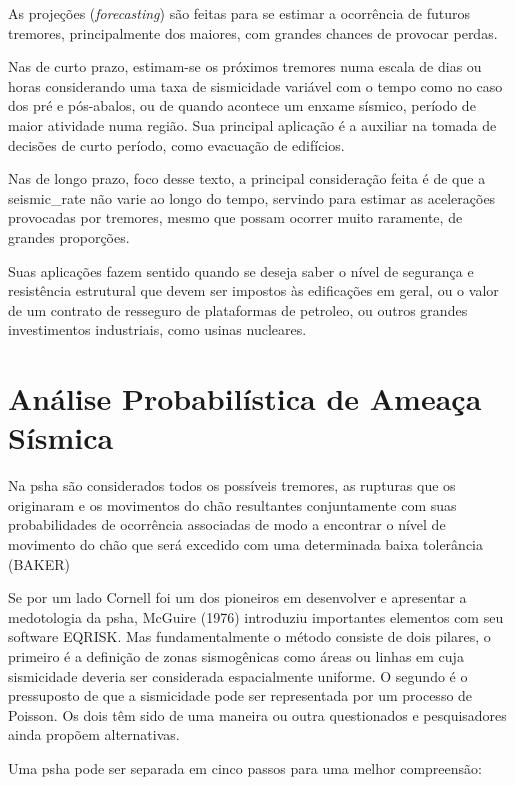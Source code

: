 As projeções (\textit{forecasting}) são feitas para se estimar a ocorrência de futuros tremores,
principalmente dos maiores, com grandes chances de provocar perdas.

Nas de curto prazo, estimam-se os próximos tremores
numa escala de dias ou horas considerando uma taxa de sismicidade variável 
com o tempo como no caso dos pré e pós-abalos, ou de quando 
acontece um enxame sísmico, período de maior atividade numa região.
Sua principal aplicação é a auxiliar na tomada de decisões de curto período, 
como evacuação de edifícios.

Nas de longo prazo, foco desse texto, a principal consideração feita é de que a 
\gls{seismic_rate} não varie ao longo do tempo, servindo para estimar as acelerações 
provocadas por tremores, mesmo que possam ocorrer
muito raramente, de grandes proporções. 

Suas aplicações fazem sentido quando
se deseja saber o nível de segurança e resistência estrutural que devem ser impostos 
às edificações em geral, ou o valor de um contrato de resseguro de plataformas de petroleo,
ou outros grandes investimentos industriais, como usinas nucleares.


\section{Análise Probabilística de Ameaça Sísmica}
\label{sec:psha}

Na \gls{psha} são considerados todos os possíveis tremores, as rupturas que os originaram e os movimentos do chão
resultantes conjuntamente com suas probabilidades de ocorrência associadas de modo a encontrar o nível de movimento do
chão que será excedido com uma determinada baixa tolerância (BAKER)

Se por um lado Cornell foi um dos pioneiros em desenvolver e apresentar a medotologia da \gls{psha}, McGuire (1976)
introduziu importantes elementos com seu software EQRISK. Mas fundamentalmente o método consiste de dois pilares, o
primeiro é a definição de zonas sismogênicas como áreas ou linhas em cuja sismicidade deveria ser considerada
espacialmente uniforme. O segundo é o pressuposto de que a sismicidade pode ser representada por um processo de Poisson.
Os dois têm sido de uma maneira ou outra questionados e pesquisadores ainda propõem alternativas.

Uma \gls{psha} pode ser separada em cinco passos para uma melhor compreensão:

